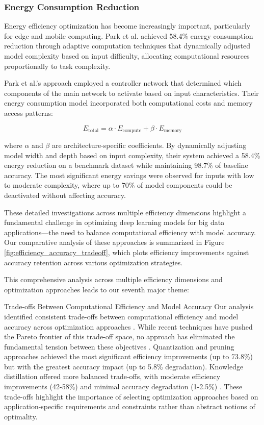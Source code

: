 \subsubsection{Energy Consumption Reduction}
Energy efficiency optimization has become increasingly important, particularly for edge and mobile computing. Park et al. \citep{Park2022} achieved 58.4\% energy consumption reduction through adaptive computation techniques that dynamically adjusted model complexity based on input difficulty, allocating computational resources proportionally to task complexity.

Park et al.'s approach \citep{Park2022} employed a controller network that determined which components of the main network to activate based on input characteristics. Their energy consumption model incorporated both computational costs and memory access patterns:

\begin{equation}
E_{\text{total}} = \alpha \cdot E_{\text{compute}} + \beta \cdot E_{\text{memory}}
\end{equation}

where $\alpha$ and $\beta$ are architecture-specific coefficients. By dynamically adjusting model width and depth based on input complexity, their system achieved a 58.4\% energy reduction on a benchmark dataset while maintaining 98.7\% of baseline accuracy. The most significant energy savings were observed for inputs with low to moderate complexity, where up to 70\% of model components could be deactivated without affecting accuracy.

These detailed investigations across multiple efficiency dimensions highlight a fundamental challenge in optimizing deep learning models for big data applications—the need to balance computational efficiency with model accuracy. Our comparative analysis of these approaches is summarized in Figure \ref{fig:efficiency_accuracy_tradeoff}, which plots efficiency improvements against accuracy retention across various optimization strategies.

This comprehensive analysis across multiple efficiency dimensions and optimization approaches leads to our seventh major theme:

\begin{themebox}{Trade-offs Between Computational Efficiency and Model Accuracy}
Our analysis identified consistent trade-offs between computational efficiency and model accuracy across optimization approaches \citep{Wang2021, Kim2022, Lin2022, Park2022}. While recent techniques have pushed the Pareto frontier of this trade-off space, no approach has eliminated the fundamental tension between these objectives \citep{Deb2014}. Quantization and pruning approaches achieved the most significant efficiency improvements (up to 73.8\%) but with the greatest accuracy impact (up to 5.8\% degradation). Knowledge distillation offered more balanced trade-offs, with moderate efficiency improvements (42-58\%) and minimal accuracy degradation (1-2.5\%) \citep{Hinton2015}. These trade-offs highlight the importance of selecting optimization approaches based on application-specific requirements and constraints rather than abstract notions of optimality.
\end{themebox}

